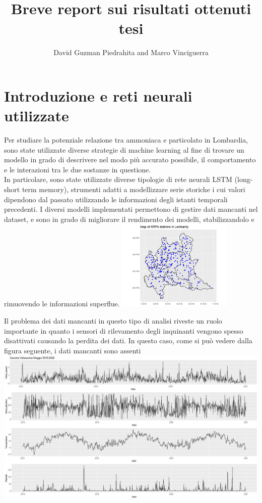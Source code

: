 \documentclass{article}
\title{Breve report sui risultati ottenuti tesi}
\author{David Guzman Piedrahita and Marco Vinciguerra}
\begin{document}
\maketitle        
\section{Introduzione e reti neurali utilizzate}
Per studiare la potenziale relazione tra ammoniaca e particolato in Lombardia, sono state utilizzate
diverse strategie di machine learning al fine di trovare un modello in grado di descrivere 
nel modo più accurato possibile, il comportamento e le interazioni tra le due 
sostanze in questione. 
\\In particolare, sono state utilizzate diverse tipologie di rete neurali LSTM (long-short term memory),
strumenti adatti a modellizzare serie storiche i cui valori dipendono dal passato utilizzando le informazioni degli
istanti temporali precedenti. I diversi modelli implementati permettono di 
gestire dati mancanti nel dataset, e sono in grado
di migliorare il rendimento dei modelli, stabilizzandolo e rimuovendo le informazioni superflue.
    \includegraphics[scale=0.8]{Immagini/Lpollution.png}

Il problema dei dati mancanti in questo tipo di analisi riveste un ruolo importante
in quanto i sensori di rilevamento degli inquinanti vengono spesso disattivati causando la perdita 
dei dati. In questo caso, come si può vedere dalla figura seguente, i dati mancanti sono assenti
\\\includegraphics[scale=0.4]{Immagini/Cassina Valsassina Moggio 2018-2020 .jpeg}
    
\end{document}
